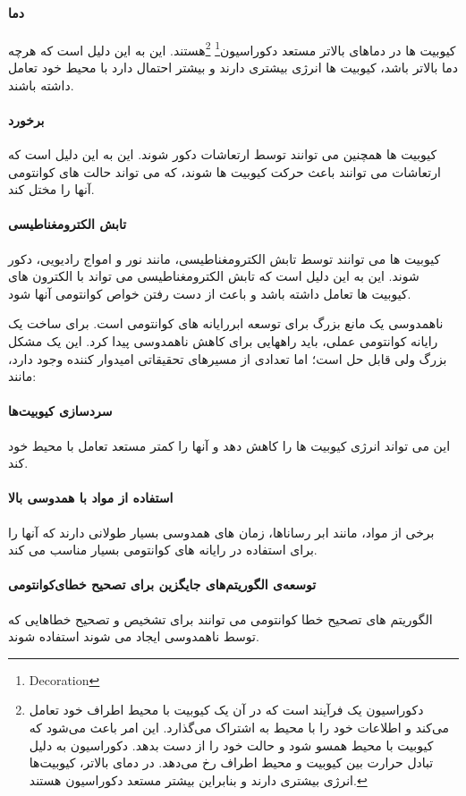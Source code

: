 \documentclass{book}
\begin{document}
\paragraph{دما}کیوبیت ها در دماهای بالاتر مستعد دکوراسیون\footnote{Decoration} \footnote{دکوراسیون یک فرآیند است که در آن یک کیوبیت با محیط اطراف خود تعامل می‌کند و اطلاعات خود را با محیط به اشتراک می‌گذارد. این امر باعث می‌شود که کیوبیت با محیط همسو شود و حالت خود را از دست بدهد. دکوراسیون به دلیل تبادل حرارت بین کیوبیت و محیط اطراف رخ می‌دهد. در دمای بالاتر، کیوبیت‌ها انرژی بیشتری دارند و بنابراین بیشتر مستعد دکوراسیون هستند.}هستند. این به این دلیل است که هرچه دما بالاتر باشد، کیوبیت ها انرژی بیشتری دارند و بیشتر احتمال دارد با محیط خود تعامل داشته باشند.

\paragraph{برخورد}کیوبیت ها همچنین می توانند توسط ارتعاشات دکور شوند. این به این دلیل است که ارتعاشات می توانند باعث حرکت کیوبیت ها شوند، که می تواند حالت های کوانتومی آنها را مختل کند.

\paragraph{تابش الکترومغناطیسی}کیوبیت ها می توانند توسط تابش الکترومغناطیسی، مانند نور و امواج رادیویی، دکور شوند. این به این دلیل است که تابش الکترومغناطیسی می تواند با الکترون های کیوبیت ها تعامل داشته باشد و باعث از دست رفتن خواص کوانتومی آنها شود.

ناهمدوسی یک مانع بزرگ برای توسعه ابررایانه های کوانتومی است. برای ساخت یک رایانه کوانتومی عملی، باید راههایی برای کاهش ناهمدوسی پیدا کرد. این یک مشکل بزرگ ولی قابل حل است؛ اما تعدادی از مسیرهای تحقیقاتی امیدوار کننده وجود دارد، مانند:

\paragraph{سردسازی کیوبیت‌ها} این می تواند انرژی کیوبیت ها را کاهش دهد و آنها را کمتر مستعد تعامل با محیط خود کند.

\paragraph{استفاده از مواد با همدوسی بالا}برخی از مواد، مانند ابر رساناها، زمان های همدوسی بسیار طولانی دارند که آنها را برای استفاده در رایانه های کوانتومی بسیار مناسب می کند.

\paragraph{توسعه‌ی الگوریتم‌های جایگزین برای تصحیح خطای‌‌کوانتومی}
الگوریتم های تصحیح خطا کوانتومی می توانند برای تشخیص و تصحیح خطاهایی که توسط ناهمدوسی ایجاد می شوند استفاده شوند.
\end{document}
